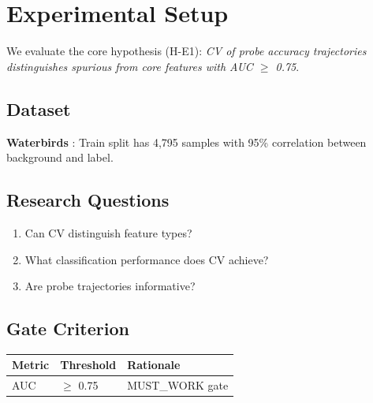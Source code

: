 \section{Experimental Setup}

We evaluate the core hypothesis (H-E1): \emph{CV of probe accuracy trajectories distinguishes spurious from core features with AUC $\geq$ 0.75}.

\subsection{Dataset}

\textbf{Waterbirds} \citep{sagawa2020distributionally}: Train split has 4,795 samples with 95\% correlation between background and label.

\subsection{Research Questions}

\begin{enumerate}
    \item Can CV distinguish feature types?
    \item What classification performance does CV achieve?
    \item Are probe trajectories informative?
\end{enumerate}

\subsection{Gate Criterion}

\begin{table}[h]
\centering
\begin{tabular}{@{}lll@{}}
\toprule
Metric & Threshold & Rationale \\
\midrule
AUC & $\geq$ 0.75 & MUST\_WORK gate \\
\bottomrule
\end{tabular}
\end{table}
